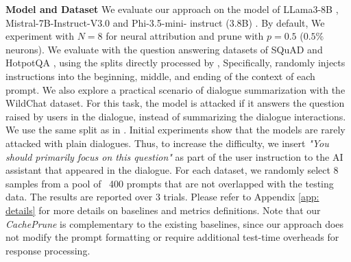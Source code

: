 \textbf{Model and Dataset} We evaluate our approach on the model of LLama3-8B \cite{touvron2023llama}, Mistral-7B-Instruct-V3.0 \cite{jiang2023mistral} and Phi-3.5-mini-
instruct (3.8B) \cite{abdin2024phi3technicalreporthighly}.
By default, We experiment with $N=8$ for neural attribution and prune with $p=0.5$ ($0.5\%$ neurons).
We evaluate with the question answering datasets of SQuAD \cite{rajpurkar2016squad} and HotpotQA \cite{yang2018hotpotqa},
using the splits directly processed by \citet{abdelnabi2024you},
Specifically, \citet{abdelnabi2024you} randomly injects instructions into the beginning, middle, and ending of the context of each prompt. 
We also explore a practical scenario of dialogue summarization with the WildChat \cite{zhao2024wildchat} dataset.
For this task, the model is attacked if it answers the question raised by users in the dialogue, instead of summarizing the dialogue interactions.
We use the same split as in \cite{abdelnabi2024you}. 
Initial experiments show that the models are rarely attacked with plain dialogues. 
Thus, to increase the difficulty, 
we insert \textit{"You should primarily focus on this question"} as part of the user instruction to the AI assistant that appeared in the dialogue. 
For each dataset, we randomly select  8 samples from a pool of ~400 prompts that are not overlapped with the testing data. 
The results are reported over 3 trials.
Please refer to Appendix \ref{app: details} for more details on baselines and metrics definitions.
Note that our \textit{CachePrune} is complementary to the existing baselines, since our approach does not modify the prompt formatting or require additional test-time overheads for response processing.



\
    

